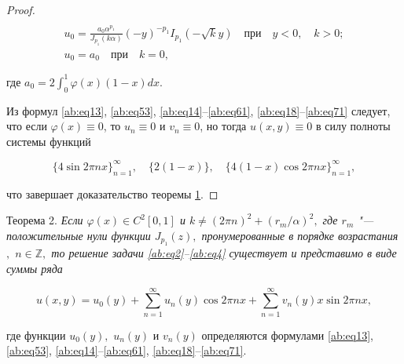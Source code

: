 \begin{proof}
\begin{gather}
\\

\label{ab:eq71}

u_0=\frac{a_0\alpha^{p_1}}{J_{p_1}(k\alpha)}(-y)^{-p_1}I_{p_1}(-\sqrt{k}y)\quad\mbox{при}\quad y<0,\quad k>0;

\\

\label{ab:eq71}

u_0=a_0\quad\mbox{при}\quad k=0,

\end{gather}

где $a_0=2 \displaystyle \int _0^1\varphi(x)(1-x)dx$.



Из формул \eqref{ab:eq13}, \eqref{ab:eq53}, \eqref{ab:eq14}--\eqref{ab:eq61}, \eqref{ab:eq18}--\eqref{ab:eq71} следует, что если $\varphi(x)\equiv0$, то $u_n\equiv0$ и $v_n\equiv0$, но тогда $u(x,y)\equiv0$ в силу полноты системы функций \cite{ab:bib:Moiseev2}



$$\{4\sin 2\pi nx\}_{n=1}^{\infty},\quad \{2(1-x)\},\quad \{4(1-x)\cos 2\pi nx\}_{n=1}^{\infty},

$$

что завершает доказательство теоремы \hyperlink{ab:th1}{1}.

\end{proof}










\hypertarget{ab:th2}{}



{\small\sc Теорема 2.} \it Если $\varphi(x)\in C^2[0, 1]$ и $k\ne(2\pi n)^2+\left({r_m}/{\alpha}\right)^2,$ где $r_m$ "--- положительные нули функции $J_{p_1}(z),$ пронумерованные в порядке возрастания$,$ $n\in\mathbb{Z},$ то решение задачи \eqref{ab:eq2}--\eqref{ab:eq4} существует и представимо в виде суммы ряда

\begin{equation}

\label{ab:eq26}

u(x,y)=u_0(y)+\sum\limits_{n=1}^{\infty}u_n(y)\cos2\pi nx+\sum\limits_{n=1}^{\infty}v_n(y)x\sin2\pi nx,

\end{equation}

где функции $u_0(y),$ $u_n(y)$ и $v_n(y)$ определяются формулами \rm \eqref{ab:eq13}, \eqref{ab:eq53}, \eqref{ab:eq14}--\eqref{ab:eq61}, \eqref{ab:eq18}--\eqref{ab:eq71}.





